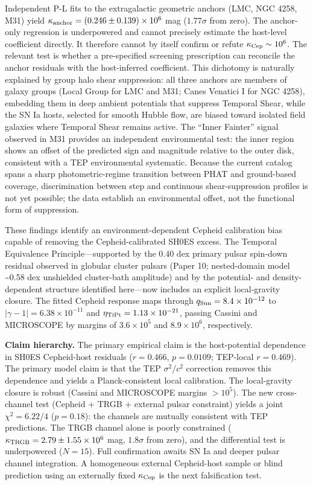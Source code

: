 \documentclass[
]{article}
\begin{document}
Independent P-L fits to the extragalactic geometric anchors (LMC, NGC
4258, M31) yield \(\kappa_{\rm anchor} = (0.246 \pm 0.139) \times 10^6\)
mag (\(1.77\sigma\) from zero). The anchor-only regression is
underpowered and cannot precisely estimate the host-level coefficient
directly. It therefore cannot by itself confirm or refute
\(\kappa_{\rm Cep}\sim10^6\). The relevant test is whether a
pre-specified screening prescription can reconcile the anchor residuals
with the host-inferred coefficient. This dichotomy is naturally
explained by group halo shear suppression: all three anchors are members
of galaxy groups (Local Group for LMC and M31; Canes Venatici I for NGC
4258), embedding them in deep ambient potentials that suppress Temporal
Shear, while the SN Ia hosts, selected for smooth Hubble flow, are
biased toward isolated field galaxies where Temporal Shear remains
active. The ``Inner Fainter'' signal observed in M31 provides an
independent environmental test: the inner region shows an offset of the
predicted sign and magnitude relative to the outer disk, consistent with
a TEP environmental systematic. Because the current catalog spans a
sharp photometric-regime transition between PHAT and ground-based
coverage, discrimination between step and continuous shear-suppression
profiles is not yet possible; the data establish an environmental
offset, not the functional form of suppression.

These findings identify an environment-dependent Cepheid calibration
bias capable of removing the Cepheid-calibrated SH0ES excess. The
Temporal Equivalence Principle---supported by the 0.40 dex primary
pulsar spin-down residual observed in globular cluster pulsars (Paper
10; nested-domain model \textasciitilde0.58 dex unshielded cluster-bath
amplitude) and by the potential- and density-dependent structure
identified here---now includes an explicit local-gravity closure. The
fitted Cepheid response maps through \(q_{\rm Sun}=8.4\times 10^{-12}\)
to \(|\gamma-1|=6.38\times 10^{-11}\) and
\(\eta_{\rm TiPt}=1.13\times 10^{-21}\), passing Cassini and MICROSCOPE
by margins of \(3.6\times 10^5\) and \(8.9\times 10^6\), respectively.

\textbf{Claim hierarchy.} The primary empirical claim is the
host-potential dependence in SH0ES Cepheid-host residuals (\(r=0.466\),
\(p=0.0109\); TEP-local \(r=0.469\)). The primary model claim is that
the TEP \(\sigma^2/c^2\) correction removes this dependence and yields a
Planck-consistent local calibration. The local-gravity closure is robust
(Cassini and MICROSCOPE margins \(>10^5\)). The new cross-channel test
(Cepheid + TRGB + external pulsar constraint) yields a joint
\(\chi^2 = 6.22/4\) (\(p = 0.18\)): the channels are mutually consistent
with TEP predictions. The TRGB channel alone is poorly constrained
(\(\kappa_{\rm TRGB} = 2.79 \pm 1.55 \times 10^6\) mag, \(1.8\sigma\)
from zero), and the differential test is underpowered (\(N=15\)). Full
confirmation awaits SN Ia and deeper pulsar channel integration. A
homogeneous external Cepheid-host sample or blind prediction using an
externally fixed \(\kappa_{\rm Cep}\) is the next falsification test.
\end{document}
